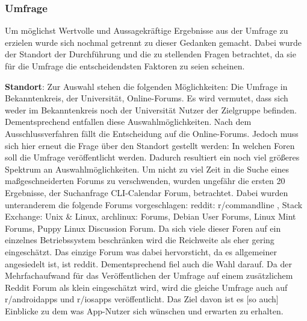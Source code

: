 \subsubsection{Umfrage}\label{subsection:umfrage}\myCheckmark
Um möglichst Wertvolle und Aussagekräftige Ergebnisse aus der Umfrage zu erzielen wurde sich nochmal getrennt zu dieser Gedanken gemacht. %
Dabei wurde der Standort der Durchführung und die zu stellenden Fragen betrachtet, da sie für die Umfrage die entscheidendsten Faktoren zu seien scheinen.%

\myNewSection
\textbf{Standort}: %
Zur Auswahl stehen die folgenden Möglichkeiten: Die Umfrage in Bekanntenkreis, der Universität, Online-Forums.\newline%
Es wird vermutet, dass sich weder im Bekanntenkreis noch der Universität Nutzer der Zielgruppe befinden. Dementsprechend entfallen diese Auswahlmöglichkeiten.\newline%
Nach dem Ausschlussverfahren fällt die Entscheidung auf die Online-Forums. %
Jedoch muss sich hier erneut die Frage über den Standort gestellt werden: \glqq In welchen Foren soll die Umfrage veröffentlicht werden\grqq{}. %
	Dadurch resultiert ein noch viel größeres Spektrum an Auswahlmöglichkeiten. %
	Um nicht zu viel Zeit in die Suche eines maßgeschneiderten Forums zu verschwenden, wurden ungefähr die ersten 20 Ergebnisse, der Suchanfrage \glqq CLI-Calendar Forum\grqq{}, betrachtet. %
	Dabei wurden unteranderem die folgende Forums vorgeschlagen: \glqq reddit: r/commandline\grqq{}\cite{forum_rCommandLine} , \glqq Stack Exchange: Unix \& Linux\grqq{}\cite{forum_unixAndLinux}, \glqq archlinux: Forums\grqq{}\cite{forum_archlinux}, \glqq Debian User Forums\grqq{}\cite{forum_debianUserForums}, \glqq Linux Mint Forums\grqq{}\cite{forum_linuxMintForums}, \glqq Puppy Linux Discussion Forum\grqq{}\cite{forum_puppyLinux}. %
	Da sich viele dieser Foren auf ein einzelnes Betriebssystem beschränken wird die Reichweite als eher gering eingeschätzt. %
		Das einzige Forum was dabei hervorsticht, da es allgemeiner angesiedelt ist, ist reddit. Dementsprechend fiel auch die Wahl darauf.\newline%
Da der Mehrfachaufwand für das Veröffentlichen der Umfrage auf einem zusätzlichem Reddit Forum als klein eingeschätzt wird, wird die gleiche Umfrage auch auf r/androidapps\cite{forum_rAndroidapps} und r/iosapps\cite{forum_rIOSapps} veröffentlicht. 
	Das Ziel davon ist es [so auch] Einblicke zu dem was App-Nutzer sich wünschen und erwarten zu erhalten.%

